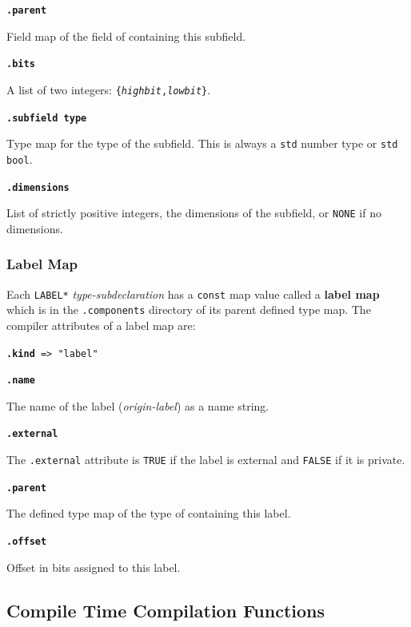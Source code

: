 \documentclass[12pt]{article}
\newcommand{\key}[1]{{\rm \bfseries #1}}
\newcommand{\ttkey}[1]{{\tt \bfseries #1}}
\newenvironment{indpar}[1][0.3in]%
	{\begin{list}{}%
		     {\setlength{\itemsep}{0in}%
		      \setlength{\topsep}{0in}%
		      \setlength{\parsep}{1ex}%
		      \setlength{\labelwidth}{#1}%
		      \setlength{\leftmargin}{#1}%
		      \addtolength{\leftmargin}{\labelsep}}%
	 \item}%
	{\end{list}}
\begin{document}
\ttkey{.parent}
\begin{indpar}
Field map of the field of containing this subfield.
\end{indpar}

\ttkey{.bits}
\begin{indpar}
A list of two integers: {\tt \{{\rm \em highbit},{\rm \em lowbit}\}}.
\end{indpar}

\ttkey{.subfield type}
\begin{indpar}
Type map for the type of the subfield.
This is always a {\tt std} number type or {\tt std bool}.
\end{indpar}

\ttkey{.dimensions}
\begin{indpar}
List of strictly positive integers,
the dimensions of the subfield, or {\tt NONE} if no dimensions.
\end{indpar}

\subsubsection{Label Map}
\label{LABEL Map}

Each {\tt *LABEL*} {\em type-subdeclaration} has a {\tt const}
map value called a \key{label map} which is in the {\tt .components}
directory of its parent defined type map.  The compiler attributes of
a label map are:

{\tt \ttkey{.kind} => "label"}

\ttkey{.name}
\begin{indpar}
The name of the label ({\em origin-label})
as a name string.
\end{indpar}

\ttkey{.external}
\begin{indpar}
The {\tt .external} attribute is {\tt TRUE} if the label
is external and {\tt FALSE} if it is private.
\end{indpar}

\ttkey{.parent}
\begin{indpar}
The defined type map of the type of containing this label.
\end{indpar}

\ttkey{.offset}
\begin{indpar}
Offset in bits assigned to this label.
\end{indpar}


\subsection{Compile Time Compilation Functions}
\label{COMPILE-TIME-COMPILATION-FUNCTIONS}
\end{document}
